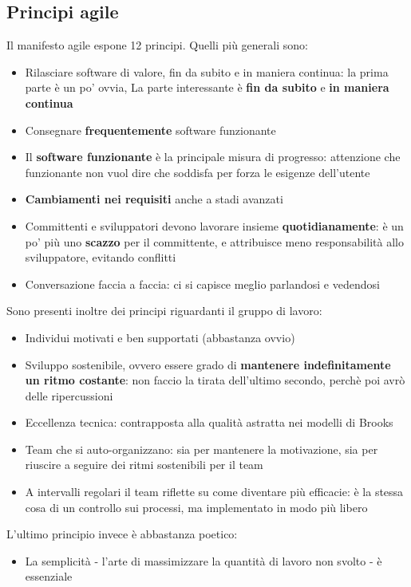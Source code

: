 \documentclass[a4paper,12pt]{article}
\begin{document}
\subsection{Principi agile}
Il manifesto agile espone 12 principi. Quelli più generali sono:
\begin{itemize}
\item Rilasciare software di valore, fin da subito e in maniera continua: la prima parte è un po' ovvia, La parte interessante è \textbf{fin da subito} e \textbf{in maniera continua}
\item Consegnare \textbf{frequentemente} software funzionante
\item Il \textbf{software funzionante} è la principale misura di progresso: attenzione che funzionante non vuol dire che soddisfa per forza le esigenze dell'utente
\item \textbf{Cambiamenti nei requisiti} anche a stadi avanzati
\item Committenti e sviluppatori devono lavorare insieme \textbf{quotidianamente}: è un po' più uno \textbf{scazzo} per il committente, e attribuisce meno responsabilità allo sviluppatore, evitando conflitti
\item Conversazione faccia a faccia: ci si capisce meglio parlandosi e vedendosi
\end{itemize}

Sono presenti inoltre dei principi riguardanti il gruppo di lavoro:
\begin{itemize}
\item Individui motivati e ben supportati (abbastanza ovvio)
\item Sviluppo sostenibile, ovvero essere grado di \textbf{mantenere indefinitamente un ritmo costante}: non faccio la tirata dell'ultimo secondo, perchè poi avrò delle ripercussioni
\item Eccellenza tecnica: contrapposta alla qualità astratta nei modelli di Brooks
\item Team che si auto-organizzano: sia per mantenere la motivazione, sia per riuscire a seguire dei ritmi sostenibili per il team
\item A intervalli regolari il team riflette su come diventare più efficacie: è la stessa cosa di un controllo sui processi, ma implementato in modo più libero
\end{itemize}
L'ultimo principio invece è abbastanza poetico:
\begin{itemize}
\item La semplicità - l'arte di massimizzare la quantità di lavoro non svolto - è essenziale
\end{itemize}
\end{document}
